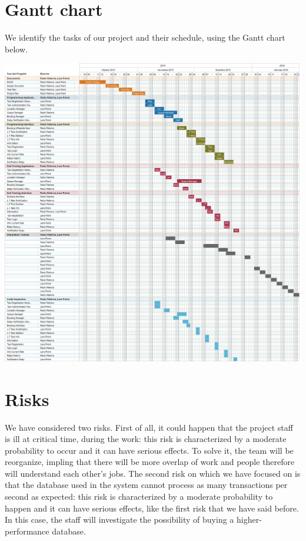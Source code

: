 \section{Gantt chart}
We identify the tasks of our project and their schedule, using the Gantt chart below.
		\begin{center}
			\includegraphics[width=1\textwidth]{./images/myTaxiService.png}
		\end{center}
		
\newpage
\section{Risks}
We have considered two risks. First of all, it could happen that the project staff is ill at critical time, during the work: this risk is characterized by a moderate probability to occur and it can have serious effects. To solve it, the team will be reorganize, impling that there will be more overlap of work and people therefore will understand each other's jobs.
The second risk on which we have focused on is that the database used in the system cannot process as many transactions per second as expected: this risk is characterized by a moderate probability to happen and it can have serious effects, like the first risk that we have said before. In this case, the staff will investigate the possibility of buying a higher-performance database.
	